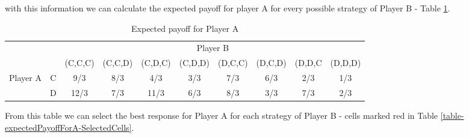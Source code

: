 \documentclass[a4paper, 11pt]{article}
\begin{document}
with this information we can calculate the expected payoff for player A for every possible strategy of Player B - Table \ref{table-expectedPayoffForA}.

\begin{table}[!htb]
\centering
\caption{Expected payoff for Player A}
\label{table-expectedPayoffForA}
\begin{tabular}{lc|c|c|c|c|c|c|c|c|}
\cline{3-10}
                                                & \multicolumn{1}{l|}{} & \multicolumn{8}{c|}{Player B}                                                \\ \cline{3-10} 
                                                &                       & (C,C,C) & (C,C,D) & (C,D,C) & (C,D,D) & (D,C,C) & (D,C,D) & (D,D,C & (D,D,D) \\ \hline
\multicolumn{1}{|l|}{\multirow{2}{*}{Player A}} & C                     & 9/3     & 8/3     & 4/3     & 3/3     & 7/3     & 6/3     & 2/3    & 1/3     \\ \cline{2-10} 
\multicolumn{1}{|l|}{}                          & D                     & 12/3    & 7/3     & 11/3    & 6/3     & 8/3     & 3/3     & 7/3    & 2/3     \\ \hline
\end{tabular}
\end{table}

From this table we can select the best response for Player A for each strategy of Player B - cells marked red in Table \ref{table-expectedPayoffForA-SelectedCells}.
\end{document}
